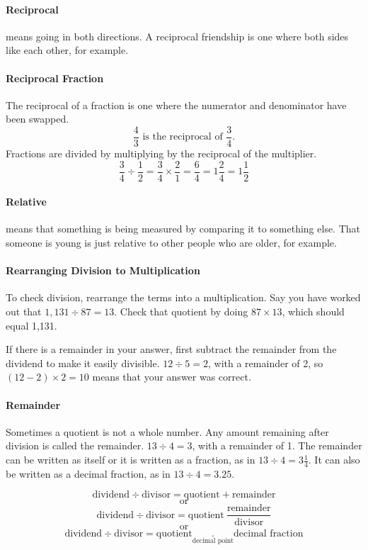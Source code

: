 \documentclass[12pt]{article}
\begin{document}
\paragraph{Reciprocal} means going in both directions. A reciprocal friendship is one where both sides like each other, for example.

\paragraph{Reciprocal Fraction}
The reciprocal of a fraction is one where the numerator and denominator have been swapped.
\[\frac{4}{3} \textrm{ is the reciprocal of }\frac{3}{4}.\]
Fractions are divided by multiplying by the reciprocal of the multiplier.
\[\frac{3}{4}\div\frac{1}{2}=\frac{3}{4}\times\frac{2}{1}=\frac{6}{4}=1\frac{2}{4}=1\frac{1}{2}\]

\paragraph{Relative} means that something is being measured by comparing it to something else. That someone is young is just relative to other people who are older, for example.

\paragraph{Rearranging Division to Multiplication}
To check division, rearrange the terms into a multiplication. Say you have worked out that $1,131 \div 87 = 13$. Check that quotient by doing $87 \times 13$, which should equal 1,131.

If there is a  remainder in your answer, first subtract the remainder from the dividend to make it easily divisible. $12 \div 5 = 2$, with a remainder of 2, so $(12 - 2) \times 2 = 10$ means that your answer was correct.\\

\paragraph{Remainder}
Sometimes a quotient is not a whole number. Any amount remaining after division is called the remainder. $13 \div 4 = 3$, with a remainder of 1. The remainder can be written as itself or it is written as a fraction, as in $13 \div 4 = 3 \frac{1}{4}$. It can also be written as a decimal fraction, as in $13 \div 4 = 3.25.$

$$\textrm{dividend} \div \textrm{divisor} = \textrm{quotient} + \textrm{remainder}$$
$$\textrm{or}$$
$$\textrm{dividend} \div \textrm{divisor} = \textrm{quotient} \ \frac{\textrm{remainder}}{\textrm{divisor}}$$
$$\textrm{or}$$
$$\textrm{dividend} \div \textrm{divisor} = \textrm{quotient} \underset{\textrm{decimal point}}{.} \textrm{decimal fraction}$$
\end{document}
